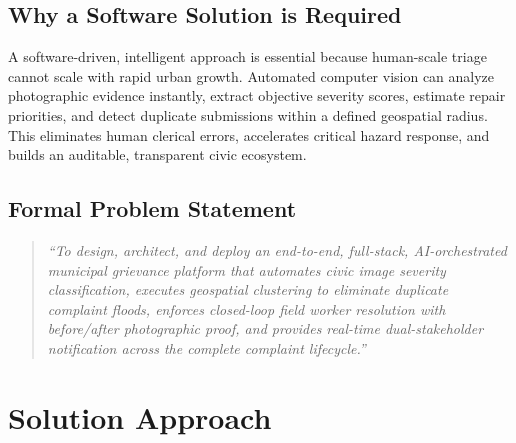 \documentclass[11pt,a4paper]{article}
\begin{document}
\subsection{Why a Software Solution is Required}
A software-driven, intelligent approach is essential because human-scale triage cannot scale with rapid urban growth. Automated computer vision can analyze photographic evidence instantly, extract objective severity scores, estimate repair priorities, and detect duplicate submissions within a defined geospatial radius. This eliminates human clerical errors, accelerates critical hazard response, and builds an auditable, transparent civic ecosystem.

\subsection{Formal Problem Statement}
\begin{quote}
\textit{``To design, architect, and deploy an end-to-end, full-stack, AI-orchestrated municipal grievance platform that automates civic image severity classification, executes geospatial clustering to eliminate duplicate complaint floods, enforces closed-loop field worker resolution with before/after photographic proof, and provides real-time dual-stakeholder notification across the complete complaint lifecycle.''}
\end{quote}

\section{Solution Approach}
\end{document}

